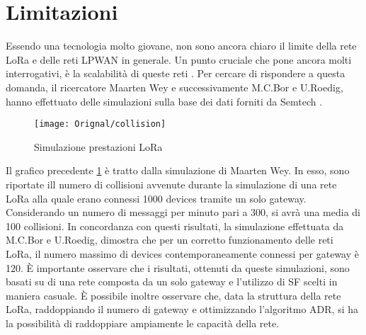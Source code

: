\section{Limitazioni}
Essendo una tecnologia molto giovane, non sono ancora chiaro il limite della
rete LoRa e delle reti LPWAN in generale. 
Un punto cruciale che pone ancora molti interrogativi, è la scalabilità di
queste reti . Per cercare di rispondere a questa domanda, il ricercatore Maarten Wey e
successivamente M.C.Bor e U.Roedig, hanno effettuato delle simulazioni sulla
base dei dati forniti da Semtech .
\begin{figure}[h]
        \centering 
                \texttt{[image: Orignal/collision]}
        \caption{Simulazione prestazioni LoRa}
        \label{fig:collision}
\end{figure}
Il grafico precedente \ref{fig:collision} è tratto dalla simulazione di Maarten
Wey. In esso, sono riportate ill numero di collisioni
avvenute durante la simulazione di una rete LoRa alla quale erano connessi 1000
devices tramite un solo gateway. 
Considerando un numero di messaggi per minuto pari a 300, si avrà una media di
100 collisioni. In concordanza con questi  risultati, la simulazione effettuata
da M.C.Bor e U.Roedig, dimostra che  per un corretto funzionamento delle reti
LoRa, il numero massimo di devices contemporaneamente connessi per gateway è 120.
È importante osservare che i risultati,
ottenuti da queste simulazioni, sono basati su di una rete composta da un solo
gateway e l'utilizzo di SF scelti in maniera casuale.  È possibile inoltre
osservare che, data la struttura della rete LoRa, 
raddoppiando il numero di gateway e ottimizzando l'algoritmo ADR, si
ha la possibilità di raddoppiare ampiamente le capacità della rete.



